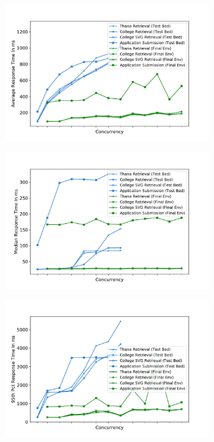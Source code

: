 \documentclass[sigconf,authordraft]{acmart}
\begin{document}
\begin{figure}
	\centering
	\begin{subfigure}{0.49\linewidth}
		\includegraphics[width=\linewidth]{Average_con}
		\caption{}
		\label{fig:avg_con}
	\end{subfigure}
	\begin{subfigure}{0.49\linewidth}
		\includegraphics[width=\linewidth]{Median_con}
		\caption{}
		\label{fig:med_con}
	\end{subfigure}
	\begin{subfigure}{0.49\linewidth}
		\includegraphics[width=\linewidth]{95th_con}

\end{subfigure}
\end{figure}
\end{document}
